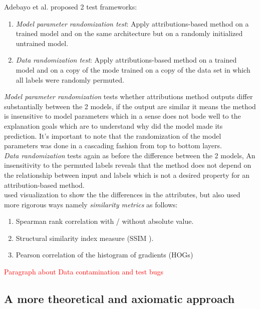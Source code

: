 \documentclass[12pt]{report}
\begin{document}
Adebayo et al. \cite{https://doi.org/10.48550/arxiv.1810.03292} proposed 2 test frameworks: 
\begin{enumerate}
	\item \textit{Model parameter randomization test}: Apply attributions-based method on a trained model and on the same architecture but on a randomly initialized untrained model.
	\item \textit{Data randomization test}: Apply attributions-based method on a trained model and on a copy of the mode trained on a copy of the data set in which all labels were randomly permuted.
\end{enumerate}

\textit{Model parameter randomization} tests whether attributions method outputs differ substantially between the 2 models, if the output are similar it means the method is insensitive to model parameters which in a sense does not bode well to the explanation goals which are to understand why did the model made its prediction. It's important to note that the randomization of the model parameters was done in a cascading fashion from top to bottom layers. \\

\textit{Data randomization} tests again as before the difference between the 2 models, An insensitivity to the permuted labels reveals that the method does not depend on the relationship between input and labels which is not a desired property for an attribution-based method. \\

\cite{https://doi.org/10.48550/arxiv.1810.03292} used visualization to show the the differences in the attributes, but also used more rigorous ways namely \textit{similarity metrics} as follows:
\begin{enumerate}
	\item Spearman rank correlation with / without  absolute value.
	\item Structural similarity index measure (SSIM \cite{1284395}).
	\item Pearson correlation of the histogram of gradients (HOGs)
\end{enumerate}


\textcolor{red}{Paragraph about Data contamination and test bugs} \cite{DBLP:journals/corr/abs-2011-05429}

\subsection{A more theoretical and axiomatic approach}
\end{document}
